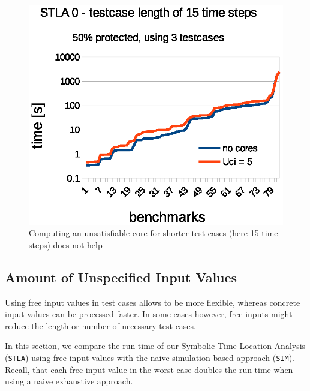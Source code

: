 \documentclass[a4paper,10pt]{article}
\begin{document}
\begin{figure}[!htb]
\centering
\includegraphics[scale = 0.57]{img/uci-15ts.eps}
\centering \caption{Computing an unsatisfiable core for shorter test cases (here 15 time steps) does not help} 
\label{uci-15ts}
\end{figure}

\subsection{Amount of Unspecified Input Values} \label{sec_free_inputs}
Using free input values in test cases allows to be more flexible, whereas concrete input values can be processed faster. In some cases however, free inputs might reduce the 
length or number of necessary test-cases.

In this section, we compare the run-time of our Symbolic-Time-Location-Analysis (\texttt{STLA}) using free input values with the naive simulation-based approach (\texttt{SIM}).
Recall, that each free input value in the worst case doubles the run-time when using a naive exhaustive approach.
\end{document}
